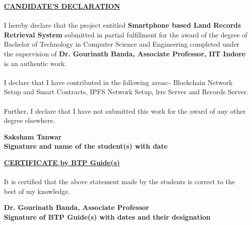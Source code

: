 \documentclass[12pt]{article}
\newcommand{\mainauth}{Saksham Tanwar}
\begin{document}
{
    \begin{center}
        \textbf{\underline{\large{CANDIDATE’S DECLARATION}}}
    \end{center}

    \paragraph{}
    I hereby declare that the project entitled \textbf{Smartphone based Land Records Retrieval System} submitted in partial fulfillment for the award of the degree of Bachelor of Technology in Computer Science and Engineering completed under the supervision of \textbf{Dr. Gourinath Banda, Associate Professor, IIT Indore} is an authentic work.

    \paragraph{}
    I declare that I have contributed in the following areas:- Blockchain Network Setup and Smart Contracts, IPFS Network Setup, \acrshort{lrrs} Server and Records Server.

    \paragraph{}
    Further, I declare that I have not submitted this work for the award of any other degree elsewhere.

    \vspace{2cm}

    \begin{flushright}
        \textbf{\mainauth}\\
        \textbf{Signature and name of the student(s) with date}
    \end{flushright}
    \vspace{1cm}

    \begin{center}
        \textbf{\underline{\large{CERTIFICATE by BTP Guide(s)}}}
    \end{center}

    \paragraph{}
    It is certified that the above statement made by the students is correct to the best of my knowledge.

    \vspace{2cm}

    \begin{flushright}
        \textbf{Dr. Gourinath Banda, Associate Professor}\\
        \textbf{Signature of BTP Guide(s) with dates and their designation}
    \end{flushright}

    \thispagestyle{empty}
}
\clearpage
\end{document}
